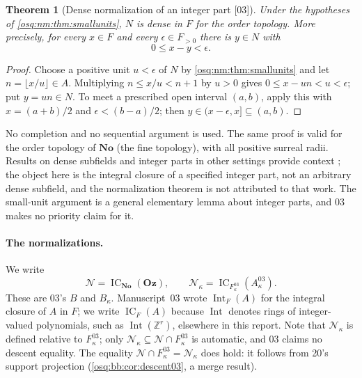 \documentclass[11pt,letterpaper]{article}
\numberwithin{equation}{section}
\newtheorem{theorem}{Theorem}[section]
\theoremstyle{definition}
\theoremstyle{remark}
\theoremstyle{plain}
\newcommand{\No}{\mathbf{No}}
\newcommand{\Oz}{\mathbf{Oz}}
\newcommand{\Z}{\mathbb Z}
\newcommand{\NN}{\mathcal N}         %
\newcommand{\IC}{\operatorname{IC}}
\newcommand{\Int}{\operatorname{Int}}
\newcommand{\src}[1]{\textup{\textsf{[#1]}}}
\begin{document}
\begin{theorem}[Dense normalization of an integer part \src{03}]\label{osq:nm:thm:density}
Under the hypotheses of \cref{osq:nm:thm:smallunits}, $N$ is dense in $F$ for the order
topology. More precisely, for every $x\in F$ and every $\epsilon\in F_{>0}$ there is
$y\in N$ with
\begin{equation}\label{osq:nm:eq:density}
 0\le x-y<\epsilon .
\end{equation}
\end{theorem}

\begin{proof}
Choose a positive unit $u<\epsilon$ of $N$ by \cref{osq:nm:thm:smallunits} and let
$n=\lfloor x/u\rfloor\in A$. Multiplying $n\le x/u<n+1$ by $u>0$ gives $0\le x-un<u<\epsilon$;
put $y=un\in N$. To meet a prescribed open interval $(a,b)$, apply this with
$x=(a+b)/2$ and $\epsilon<(b-a)/2$; then $y\in(x-\epsilon,x]\subseteq(a,b)$.
\end{proof}

No completion and no sequential argument is used. The same proof is valid for the order
topology of $\No$ (the fine topology), with all positive surreal radii. Results on dense
subfields and integer parts in other settings provide context \cite{Kuhlmann}; the object
here is the integral closure of a specified integer part, not an arbitrary dense subfield,
and the normalization theorem is not attributed to that work. The small-unit argument is
a general elementary lemma about integer parts, and 03 makes no priority claim for it.

\paragraph{The normalizations.}
We write
\begin{equation}\label{osq:nm:eq:normalizations}
 \NN=\IC_{\No}(\Oz),\qquad \NN_\kappa=\IC_{F^{03}_\kappa}(A^{03}_\kappa).
\end{equation}
These are 03's $B$ and $B_\kappa$. Manuscript~03 wrote $\Int_F(A)$ for the integral
closure of $A$ in $F$; we write $\IC_F(A)$ because $\Int$ denotes rings of integer-valued
polynomials, such as $\Int(\Z^r)$, elsewhere in this report. Note that $\NN_\kappa$ is
defined relative to $F^{03}_\kappa$; only $\NN_\kappa\subseteq\NN\cap F^{03}_\kappa$ is
automatic, and 03 claims no descent equality. The equality $\NN\cap F^{03}_\kappa=\NN_\kappa$ does hold: it follows from
20's support projection (\cref{osq:bb:cor:descent03}, a merge result).
\end{document}
